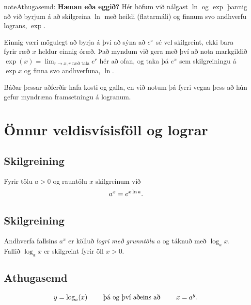 \documentclass[b5paper,10pt,icelandic]{sphinxmanual}
\begin{document}
\begin{notice}{note}{Athugasemd:}
\textbf{Hænan eða eggið?} Hér höfum við nálgast \(\ln\) og \(\exp\)
þannig að við byrjum á að skilgreina \(\ln\) með heildi (flatarmáli)
og finnum svo andhverfu lograns, \(\exp\).

Einnig væri mögulegt að byrja á því að sýna að \(e^x\) sé vel
skilgreint, ekki bara fyrir ræð \(x\) heldur einnig óræð. Það myndum
við gera með því að nota markgildið
\(\exp(x)=\lim_{r\to x, r\text{ ræð tala}} e^r\)
hér að ofan, og taka þá \(e^x\) sem
skilgreiningu á \(\exp x\) og finna svo andhverfuna, \(\ln\).

Báðar þessar aðferðir hafa kosti og galla, en við notum þá fyrri vegna
þess að hún gefur myndræna framsetningu á logranum.
\end{notice}


\section{Önnur veldisvísisföll og lograr}
\label{kafli04:onnur-veldisvisisfoll-og-lograr}

\subsection{Skilgreining}
\label{kafli04:skilgreining}\label{kafli04:index-3}
Fyrir tölu \(a>0\) og rauntölu \(x\) skilgreinum við
\begin{gather}
\begin{split}a^x=e^{x\ln a}.\end{split}\notag
\end{gather}

\subsection{Skilgreining}
\label{kafli04:id3}\label{kafli04:index-4}
Andhverfa fallsins \(a^x\) er kölluð \emph{logri með grunntölu} \(a\)
og táknuð með \(\log_a x\). Fallið \(\log_a x\) er skilgreint
fyrir öll \(x>0\).


\subsection{Athugasemd}
\label{kafli04:athugasemd}\begin{gather}
\begin{split}y =\log_a(x)\qquad \text{ þá og því aðeins að } \qquad x = a^y.\end{split}\notag
\end{gather}
\end{document}
